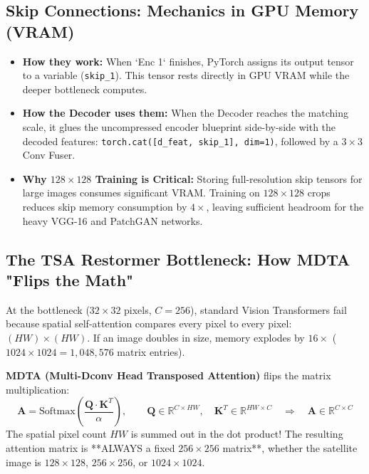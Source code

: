 \documentclass[11pt,a4paper]{article}
\begin{document}
\subsection{Skip Connections: Mechanics in GPU Memory (VRAM)}
\begin{itemize}[leftmargin=1.5em]
    \item \textbf{How they work:} When `Enc 1` finishes, PyTorch assigns its output tensor to a variable (\texttt{skip\_1}). This tensor rests directly in GPU VRAM while the deeper bottleneck computes.
    \item \textbf{How the Decoder uses them:} When the Decoder reaches the matching scale, it glues the uncompressed encoder blueprint side-by-side with the decoded features: \texttt{torch.cat([d\_feat, skip\_1], dim=1)}, followed by a $3\times 3$ Conv Fuser.
    \item \textbf{Why $128 \times 128$ Training is Critical:} Storing full-resolution skip tensors for large images consumes significant VRAM. Training on $128 \times 128$ crops reduces skip memory consumption by $4\times$, leaving sufficient headroom for the heavy VGG-16 and PatchGAN networks.
\end{itemize}

\subsection{The TSA Restormer Bottleneck: How MDTA "Flips the Math"}
At the bottleneck ($32 \times 32$ pixels, $C=256$), standard Vision Transformers fail because spatial self-attention compares every pixel to every pixel: $(HW) \times (HW)$. If an image doubles in size, memory explodes by $16\times$ ($1024 \times 1024 = 1{,}048{,}576$ matrix entries).

\textbf{MDTA (Multi-Dconv Head Transposed Attention)} flips the matrix multiplication:
\begin{equation}
\mathbf{A} = \text{Softmax}\left(\frac{\mathbf{Q} \cdot \mathbf{K}^T}{\alpha}\right), \qquad 
\mathbf{Q} \in \mathbb{R}^{C \times HW}, \quad \mathbf{K}^T \in \mathbb{R}^{HW \times C} \quad \Longrightarrow \quad \mathbf{A} \in \mathbb{R}^{C \times C}
\end{equation}
The spatial pixel count $HW$ is summed out in the dot product! The resulting attention matrix is **ALWAYS a fixed $256 \times 256$ matrix**, whether the satellite image is $128 \times 128$, $256 \times 256$, or $1024 \times 1024$.
\end{document}
